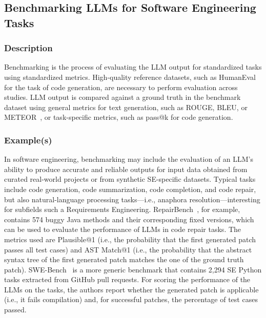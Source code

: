 \subsection{Benchmarking LLMs for Software Engineering Tasks}

\subsubsection{Description}

Benchmarking is the process of evaluating the LLM output for standardized tasks using standardized metrics.
High-quality reference datasets, such as HumanEval~\cite{DBLP:journals/corr/abs-2107-03374} for the task of code generation, are necessary to perform evaluation across studies.
LLM output is compared against a ground truth in the benchmark dataset using general metrics for text generation, such as ROUGE, BLEU, or METEOR~\cite{10.1145/3695988}, or task-specific metrics, such as pass@k for code generation.

\subsubsection{Example(s)}

In software engineering, benchmarking may include the evaluation of an LLM's ability to produce accurate and reliable outputs for input data obtained from curated real-world projects or from synthetic SE-specific datasets.
Typical tasks include code generation, code summarization, code completion, and code repair, but also natural-language processing tasks---i.e., anaphora resolution---interesting for subfields such a Requirements Engineering. 
RepairBench~\cite{silva2024repairbench}, for example, contains 574 buggy Java methods and their corresponding fixed versions, which can be used to evaluate the performance of LLMs in code repair tasks.
The metrics used are Plausible@1 (i.e., the probability that the first generated patch passes all test cases) and AST Match@1 (i.e., the probability that the abstract syntax tree of the first generated patch matches the one of the ground truth patch).
SWE-Bench~\cite{DBLP:conf/iclr/JimenezYWYPPN24} is a more generic benchmark that contains 2,294 SE Python tasks extracted from GitHub pull requests.
For scoring the performance of the LLMs on the tasks, the authors report whether the generated patch is applicable (i.e., it fails compilation) and, for successful patches, the percentage of test cases passed.

